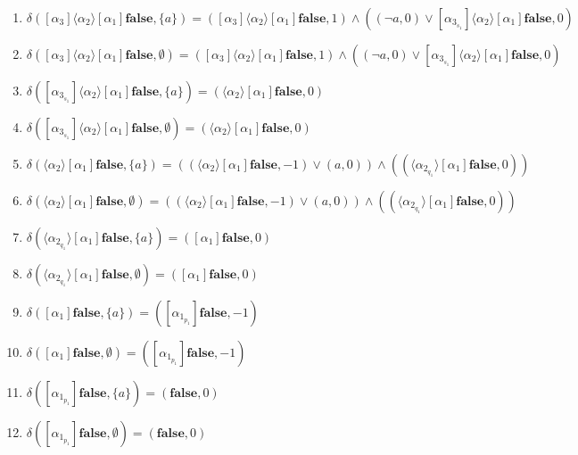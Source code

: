 \documentclass[10pt,a4paper]{amsart}
\theoremstyle{plain}
\theoremstyle{definition}
\theoremstyle{definition}
\newcommand{\dbox}[1]{\langle #1 \rangle}
\newcommand{\bbox}[1]{[ #1 ]}
\DeclareMathOperator{\?}{?}
\begin{document}
\begin{enumerate}[align=left]
\item $\delta(\bbox{\alpha_3}\dbox{\alpha_2}\bbox{\alpha_1}\textbf{false}, \{a\}) =
  (\bbox{\alpha_3}\dbox{\alpha_2}\bbox{\alpha_1}\textbf{false}, 1)  \wedge ((\neg a, 0) \vee \bbox{\alpha_{3_{s_1}}}\dbox{\alpha_2}\bbox{\alpha_1}\textbf{false}, 0)$

 \item $\delta(\bbox{\alpha_3}\dbox{\alpha_2}\bbox{\alpha_1}\textbf{false}, \emptyset) =
  (\bbox{\alpha_3}\dbox{\alpha_2}\bbox{\alpha_1}\textbf{false}, 1)  \wedge ((\neg a, 0) \vee \bbox{\alpha_{3_{s_1}}}\dbox{\alpha_2}\bbox{\alpha_1}\textbf{false}, 0)$

 \item $\delta(\bbox{\alpha_{3_{s_1}}}\dbox{\alpha_2}\bbox{\alpha_1}\textbf{false}, \{a\}) =
   (\dbox{\alpha_2}\bbox{\alpha_1}\textbf{false},0)$

 \item $\delta(\bbox{\alpha_{3_{s_1}}}\dbox{\alpha_2}\bbox{\alpha_1}\textbf{false}, \emptyset) =
   (\dbox{\alpha_2}\bbox{\alpha_1}\textbf{false},0)$

 \item $\delta(\dbox{\alpha_2}\bbox{\alpha_1}\textbf{false}, \{a\}) =
   ((\dbox{\alpha_2}\bbox{\alpha_1}\textbf{false}, -1) \vee (a, 0)) \wedge ((\dbox{\alpha_{2_{q_1}}}\bbox{\alpha_1}\textbf{false},0))$

 \item $\delta(\dbox{\alpha_2}\bbox{\alpha_1}\textbf{false}, \emptyset) =
   ((\dbox{\alpha_2}\bbox{\alpha_1}\textbf{false}, -1) \vee (a, 0)) \wedge ((\dbox{\alpha_{2_{q_1}}}\bbox{\alpha_1}\textbf{false},0))$

 \item $\delta(\dbox{\alpha_{2_{q_1}}}\bbox{\alpha_1}\textbf{false}, \{a\}) =
   (\bbox{\alpha_1}\textbf{false},0)$

 \item $\delta(\dbox{\alpha_{2_{q_1}}}\bbox{\alpha_1}\textbf{false}, \emptyset) =
   (\bbox{\alpha_1}\textbf{false},0)$

 \item $\delta(\bbox{\alpha_1}\textbf{false}, \{a\}) =
   (\bbox{\alpha_{1_{p_1}}}\textbf{false}, -1)$

 \item $\delta(\bbox{\alpha_1}\textbf{false}, \emptyset) =
   (\bbox{\alpha_{1_{p_1}}}\textbf{false}, -1)$

 \item $\delta(\bbox{\alpha_{1_{p_1}}}\textbf{false}, \{a\}) =
   (\textbf{false},0) $

 \item $\delta(\bbox{\alpha_{1_{p_1}}}\textbf{false}, \emptyset) =
   (\textbf{false},0) $

\end{enumerate}
\end{document}
